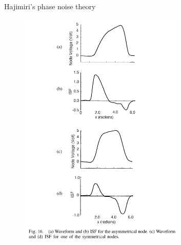 \documentclass[t, screen, aspectratio=43]{beamer}
\begin{document}
\begin{frame}
\begin{block}{Hajimiri's phase noise theory}
\begin{minipage}{6cm}
		\end{minipage}%
		\begin{minipage}{6cm}
			\begin{figure}[htb!]
			        \centering
			        \includegraphics[width=0.7\textwidth, angle=0]{isf}
			\end{figure}
		\end{minipage}%

	\end{block}	
\end{frame}
\end{document}
